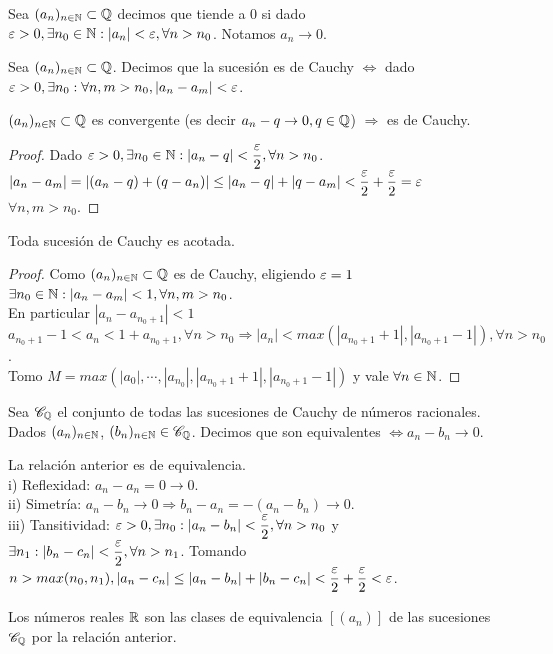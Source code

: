 Sea $(a_n)_{n \in \mathbb{N}} \subset \mathbb{Q}$ decimos que tiende a 0 si dado $\varepsilon > 0, \exists n_0 \in \mathbb{N} : |a_n| < \varepsilon, \forall n > n_0$.
Notamos $a_n \to 0$.

\begin{definition}
  Sea $(a_n)_{n \in \mathbb{N}} \subset \mathbb{Q}$. Decimos que la sucesión es de Cauchy $\iff$ dado $\varepsilon > 0, \exists n_0 : \forall n,m > n_0, |a_n - a_m| < \varepsilon$.
\end{definition}

\begin{theorem}
  $(a_n)_{n \in \mathbb{N}} \subset \mathbb{Q}$ es convergente (es decir $a_n - q \to 0, q \in \mathbb{Q}$) $\Rightarrow$ es de Cauchy.
  \begin{proof}
    Dado $\varepsilon > 0, \exists n_0 \in \mathbb{N} : |a_n - q| < \dfrac{\varepsilon}{2}, \forall n > n_0$. \\
    $|a_n - a_m| = |(a_n - q) + (q - a_n)| \leq |a_n - q| + |q - a_m| < \dfrac{\varepsilon}{2} + \dfrac{\varepsilon}{2} = \varepsilon$ \\
    $\forall n,m > n_0$.
  \end{proof}
\end{theorem}

\begin{theorem}
  Toda sucesión de Cauchy es acotada.

  \begin{proof}
    Como $(a_n)_{n \in \mathbb{N}} \subset \mathbb{Q}$ es de Cauchy, eligiendo $\varepsilon = 1$ \\
    $\exists n_0 \in \mathbb{N} : |a_n - a_m| < 1, \forall n,m > n_0$. \\
    En particular $|a_n - a_{n_0+1}| < 1$ \\
    $a_{n_0+1} - 1 < a_n < 1 + a_{n_0+1}, \forall n > n_0 \Rightarrow |a_n| < max(|a_{n_0+1} + 1|, |a_{n_0+1} - 1|), \forall n > n_0$. \\
    Tomo $M = max(|a_0|, \cdots, |a_{n_0}|, |a_{n_0+1} + 1|, |a_{n_0+1} - 1|)$ y vale $\forall n \in \mathbb{N}$.
  \end{proof}
\end{theorem}

\begin{definition}
  Sea $\mathscr{C}_{\mathbb{Q}}$ el conjunto de todas las sucesiones de Cauchy de números racionales. Dados $(a_n)_{n \in \mathbb{N}}$, $(b_n)_{n \in \mathbb{N}} \in \mathscr{C}_{\mathbb{Q}}$. Decimos que son equivalentes $\iff a_n - b_n \to 0$.
\end{definition}

\begin{prop}
  La relación anterior es de equivalencia. \\
  i) Reflexidad: $a_n - a_n = 0 \to 0$. \\
  ii) Simetría: $a_n - b_n \to 0 \Rightarrow b_n - a_n = -(a_n-b_n) \to 0$. \\
  iii) Tansitividad: $\varepsilon > 0, \exists n_0 : |a_n - b_n| < \dfrac{\varepsilon}{2}, \forall n > n_0$
  y $\exists n_1 : |b_n - c_n| < \dfrac{\varepsilon}{2}, \forall n > n_1$. Tomando $n > max(n_0, n_1), |a_n - c_n| \leq |a_n - b_n| + |b_n - c_n| < \dfrac{\varepsilon}{2} + \dfrac{\varepsilon}{2} < \varepsilon$.
\end{prop}

\begin{definition}
  Los números reales $\mathbb{R}$ son las clases de equivalencia $[(a_n)]$ de las sucesiones $\mathscr{C}_{\mathbb{Q}}$ por la relación anterior.
\end{definition}
